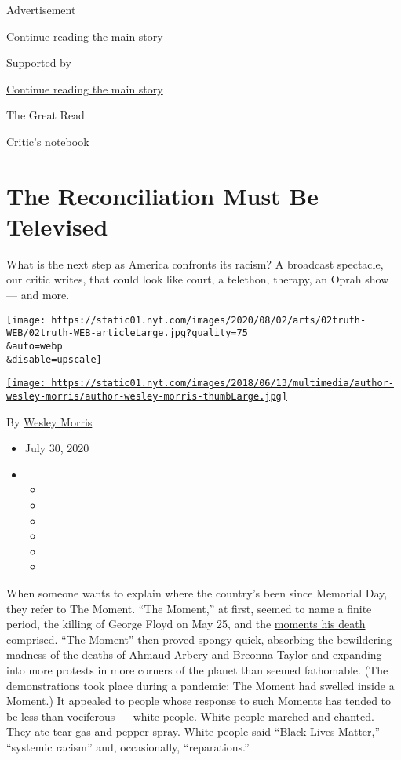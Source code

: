 Advertisement

\protect\hyperlink{after-top}{Continue reading the main story}

Supported by

\protect\hyperlink{after-sponsor}{Continue reading the main story}

The Great Read

Critic's notebook

\hypertarget{the-reconciliation-must-be-televised}{%
\section{The Reconciliation Must Be
Televised}\label{the-reconciliation-must-be-televised}}

What is the next step as America confronts its racism? A broadcast
spectacle, our critic writes, that could look like court, a telethon,
therapy, an Oprah show --- and more.

\texttt{[image: https://static01.nyt.com/images/2020/08/02/arts/02truth-WEB/02truth-WEB-articleLarge.jpg?quality=75\\\&auto=webp\\\&disable=upscale]}

\href{https://www.nytimes.com/by/wesley-morris}{\texttt{[image: https://static01.nyt.com/images/2018/06/13/multimedia/author-wesley-morris/author-wesley-morris-thumbLarge.jpg]}}

By \href{https://www.nytimes.com/by/wesley-morris}{Wesley Morris}

\begin{itemize}
\item
  July 30, 2020
\item
  \begin{itemize}
  \item
  \item
  \item
  \item
  \item
  \item
  \end{itemize}
\end{itemize}

When someone wants to explain where the country's been since Memorial
Day, they refer to The Moment. ``The Moment,'' at first, seemed to name
a finite period, the killing of George Floyd on May 25, and the
\href{https://www.nytimes.com/2020/06/03/arts/george-floyd-video-racism.html}{moments
his death comprised}. ``The Moment'' then proved spongy quick, absorbing
the bewildering madness of the deaths of Ahmaud Arbery and Breonna
Taylor and expanding into more protests in more corners of the planet
than seemed fathomable. (The demonstrations took place during a
pandemic; The Moment had swelled inside a Moment.) It appealed to people
whose response to such Moments has tended to be less than vociferous ---
white people. White people marched and chanted. They ate tear gas and
pepper spray. White people said ``Black Lives Matter,'' ``systemic
racism'' and, occasionally, ``reparations.''

